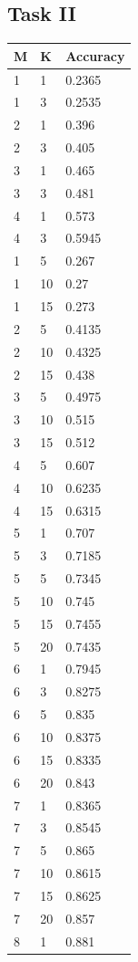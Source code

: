 \documentclass[runningheads]{llncs}
\begin{document}
\subsection{Task II}
\begin{longtable}{| p{} | p{} | p{} |} 
\hline
M & K & Accuracy\\
\hline
1 & 1 & 0.2365 \\
1 & 3 & 0.2535 \\
2 & 1 & 0.396 \\
2 & 3 & 0.405 \\
3 & 1 & 0.465 \\
3 & 3 & 0.481 \\
4 & 1 & 0.573 \\
4 & 3 & 0.5945 \\
1 & 5 & 0.267 \\
1 & 10 & 0.27 \\
1 & 15 & 0.273 \\
2 & 5 & 0.4135 \\
2 & 10 & 0.4325 \\
2 & 15 & 0.438 \\
3 & 5 & 0.4975 \\
3 & 10 & 0.515 \\
3 & 15 & 0.512 \\
4 & 5 & 0.607 \\
4 & 10 & 0.6235 \\
4 & 15 & 0.6315 \\
5 & 1 & 0.707 \\
5 & 3 & 0.7185 \\
5 & 5 & 0.7345 \\
5 & 10 & 0.745 \\
5 & 15 & 0.7455 \\
5 & 20 & 0.7435 \\
6 & 1 & 0.7945 \\
6 & 3 & 0.8275 \\
6 & 5 & 0.835 \\
6 & 10 & 0.8375 \\
6 & 15 & 0.8335 \\
6 & 20 & 0.843 \\
7 & 1 & 0.8365 \\
7 & 3 & 0.8545 \\
7 & 5 & 0.865 \\
7 & 10 & 0.8615 \\
7 & 15 & 0.8625 \\
7 & 20 & 0.857 \\
8 & 1 & 0.881 \\

\end{longtable}
\end{document}
